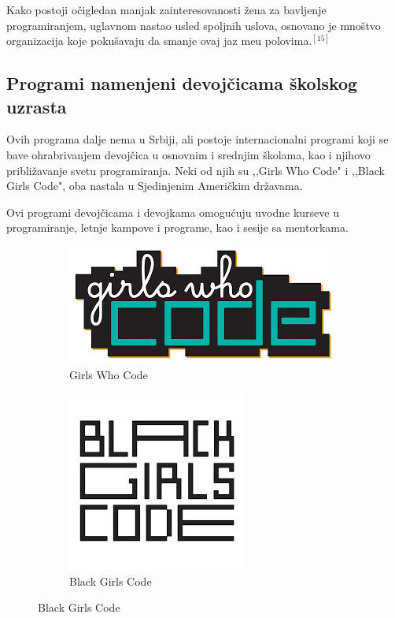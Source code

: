 \documentclass[12pt]{article}
\begin{document}
Kako postoji očigledan manjak zainteresovanosti žena za bavljenje programiranjem, uglavnom nastao usled spoljnih uslova, osnovano je mnoštvo organizacija koje pokušavaju da smanje ovaj jaz me\dj u polovima.$^{[15]}$

\subsection{Programi namenjeni devojčicama školskog uzrasta}

Ovih programa dalje nema u Srbiji, ali postoje internacionalni programi koji se bave ohrabrivanjem devojčica u osnovnim i srednjim školama, kao i njihovo približavanje svetu programiranja. Neki od njih su ,,Girls Who Code" i ,,Black Girls Code", oba nastala u Sjedinjenim Američkim državama.

Ovi programi devojčicama i devojkama omogućuju uvodne kurseve u programiranje, letnje kampove i programe, kao i sesije sa mentorkama.

\begin{figure}[htp]
    \centering
    \begin{subfigure}{.5\textwidth}
        \centering
        \includegraphics[width=0.5\linewidth]{gwc.png}
        \caption{Girls Who Code}
    \end{subfigure}

    \begin{subfigure}{.5\textwidth}
    \centering
    \includegraphics[width=0.5\linewidth]{gbc.png}
    \caption{Black Girls Code}
    \end{subfigure}
\end{figure}
\end{document}

